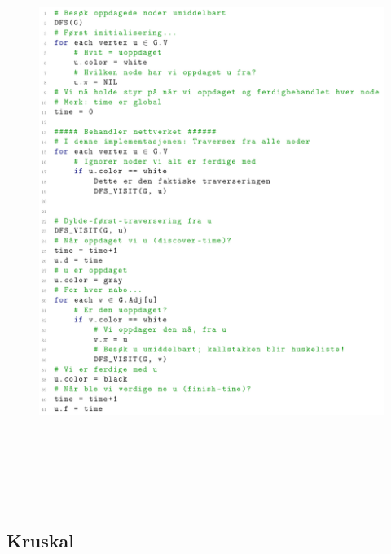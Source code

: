 \documentclass[12pt]{report}
\begin{document}
\begin{figure}[H]
	\begin{Center}
		\includegraphics[width=6.3in,height=7.44in]{./media/image184.png}
	\end{Center}
\end{figure}






\newpage
\par

\subsection*{Kruskal}
\end{document}

